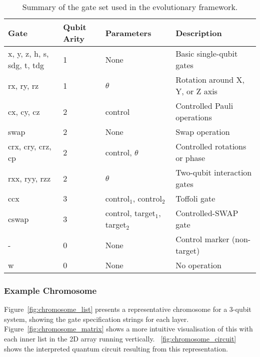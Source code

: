 \documentclass[11pt,a4paper]{article}
\begin{document}
\begin{table}[H]
    \centering
    \begin{tabular}{llll}
        \toprule
        \textbf{Gate} & \textbf{Qubit Arity} & \textbf{Parameters} & \textbf{Description} \\
        \midrule
        x, y, z, h, s, sdg, t, tdg & 1 & None & Basic single-qubit gates \\
        rx, ry, rz & 1 & $\theta$ & Rotation around X, Y, or Z axis \\
        cx, cy, cz & 2 & control & Controlled Pauli operations \\
        swap & 2 & None & Swap operation \\
        crx, cry, crz, cp & 2 & control, $\theta$ & Controlled rotations or phase \\
        rxx, ryy, rzz & 2 & $\theta$ & Two-qubit interaction gates \\
        ccx & 3 & control$_1$, control$_2$ & Toffoli gate \\
        cswap & 3 & control, target$_1$, target$_2$ & Controlled-SWAP gate \\
        - & 0 & None & Control marker (non-target) \\
        w & 0 & None & No operation \\
        \bottomrule
    \end{tabular}
    \caption{Summary of the gate set used in the evolutionary framework.}
    \label{tab:gateset}
\end{table}

\subsubsection*{Example Chromosome} Figure~\ref{fig:chromosome_list} presents a representative chromosome for a 3-qubit system, showing the gate specification strings for each layer. Figure~\ref{fig:chromosome_matrix} shows a more intuitive visualisation of this with each inner list in the 2D array running vertically. ~\ref{fig:chromosome_circuit} shows the interpreted quantum circuit resulting from this representation.
\end{document}
